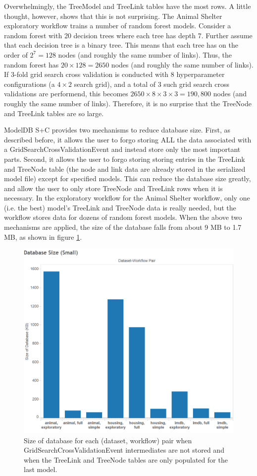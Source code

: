 Overwhelmingly, the TreeModel and TreeLink tables have the most rows. A little
thought, however, shows that this is not surprising. The Animal Shelter exploratory workflow
trains a number of random forest models. Consider
a random forest with 20 decision trees where each tree has depth 7. Further assume
that each decision tree is a binary tree. This means that each tree has on the
order of $2^{7} = 128$ nodes (and roughly the same number of links). Thus, the
random forest has $20 \times 128 = 2650$ nodes (and roughly the same number of links).
If 3-fold grid search cross validation is conducted with 8 hyperparameter configurations (a $4 \times 2$ 
search grid), and a total of 3 such grid search cross validations are performend, 
this becomes $2650 \times 8 \times 3 \times 3 = 190,800$ nodes (and roughly the same number of links).
Therefore, it is no surprise that the TreeNode and TreeLink tables are so large.

ModelDB S+C provides two mechanisms to reduce database size. First, as described before, it
allows the user to forgo storing ALL the data associated with a GridSearchCrossValidationEvent and instead
store only the most important parts.
Second, it allows the user to forgo storing storing entries in the TreeLink and TreeNode table (the
node and link data are already stored in the serialized model file) except for specified models. This can reduce the database size
greatly, and allow the user to only store TreeNode and TreeLink rows when it is necessary. In the 
exploratory workflow for the Animal Shelter workflow, only one (i.e. the best)  model's TreeLink and TreeNode data is really needed,
but the workflow stores data for dozens of random forest models. When the above two mechanisms are applied,
the size of the database falls from about 9 MB to 1.7 MB, as shown in figure \ref{fig:dbsize_small}.

\begin{figure}
  \centering
  \includegraphics[width=5.0in]{dbsize_small}
  \caption{
    Size of database for each (dataset, workflow) pair when GridSearchCrossValidationEvent intermediates
    are not stored and when the TreeLink and TreeNode tables are only populated for the last model.
  }
  \label{fig:dbsize_small}
\end{figure}


